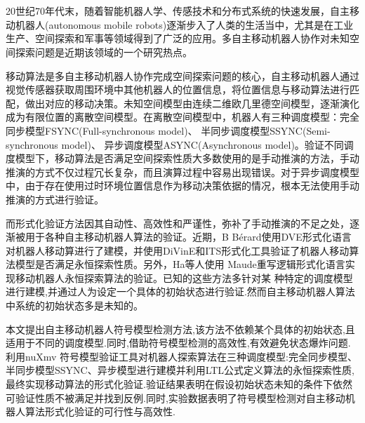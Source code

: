 \vspace{-2.5cm}
\chapter*{}
\vspace{-1cm}

20世纪70年代末，随着智能机器人学、传感技术和分布式系统的快速发展，自主移动机器人(autonomous mobile robots)逐渐步入了人类的生活当中，尤其是在工业生产、空间探索和军事等领域得到了广泛的应用。多自主移动机器人协作对未知空间探索问题是近期该领域的一个研究热点。

移动算法是多自主移动机器人协作完成空间探索问题的核心，自主移动机器人通过视觉传感器获取周围环境中其他机器人的位置信息，将位置信息与移动算法进行匹配，做出对应的移动决策。未知空间模型由连续二维欧几里德空间模型，逐渐演化成为有限位置的离散空间模型。在离散空间模型中，机器人有三种调度模型：完全同步模型FSYNC(Full-synchronous model)、 半同步调度模型SSYNC(Semi-synchronous model)、 异步调度模型ASYNC(Asynchronous model)。验证不同调度模型下，移动算法是否满足空间探索性质大多数使用的是手动推演的方法，手动推演的方式不仅过程冗长复杂，而且演算过程中容易出现错误。对于异步调度模型中，由于存在使用过时环境位置信息作为移动决策依据的情况，根本无法使用手动推演的方式进行验证。

而形式化验证方法因其自动性、高效性和严谨性，弥补了手动推演的不足之处，逐渐被用于各种自主移动机器人算法的验证。近期，B Bérard使用DVE形式化语言对机器人移动算进行了建模，并使用DiVinE和ITS形式化工具验证了机器人移动算法模型是否满足永恒探索性质。另外，Ha等人使用 Maude重写逻辑形式化语言实现移动机器人永恒探索算法的验证。已知的这些方法多针对某
种特定的调度模型进行建模,并通过人为设定一个具体的初始状态进行验证.然而自主移动机器人算法
中系统的初始状态多是未知的。

本文提出自主移动机器人符号模型检测方法,该方法不依赖某个具体的初始状态,且适用于不同的调度模型.同时,借助符号模型检测的高效性,有效避免状态爆炸问题.利用nuXmv 符号模型验证工具对机器人探索算法在三种调度模型:完全同步模型、半同步模型SSYNC、异步模型进行建模并利用LTL公式定义算法的永恒探索性质,最终实现移动算法的形式化验证.验证结果表明在假设初始状态未知的条件下依然可验证性质不被满足并找到反例.同时,实验数据表明了符号模型检测对自主移动机器人算法形式化验证的可行性与高效性.

\hspace{-0.5cm}
 
